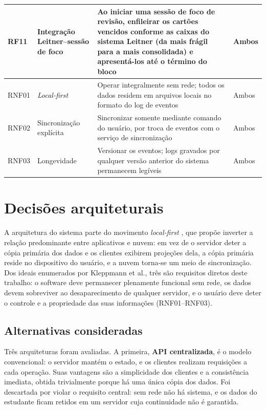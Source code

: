 \documentclass[12pt, %
openright, 
oneside,
a4paper,
english,   %
brazil]{facom-ufu-abntex2}
\begin{document}
\begin{table}[htbp]
\begin{tabular}{p{1.2cm}p{3.4cm}p{6.6cm}p{2.2cm}}
RF11 & Integração Leitner--sessão de foco & Ao iniciar uma sessão de foco de revisão, enfileirar os cartões vencidos conforme as caixas do sistema Leitner (da mais frágil para a mais consolidada) e apresentá-los até o término do bloco & Ambos \\
\hline
RNF01 & \textit{Local-first} & Operar integralmente sem rede; todos os dados residem em arquivos locais no formato do log de eventos & Ambos \\
RNF02 & Sincronização explícita & Sincronizar somente mediante comando do usuário, por troca de eventos com o serviço de sincronização & Ambos \\
RNF03 & Longevidade & Versionar os eventos; logs gravados por qualquer versão anterior do sistema permanecem legíveis & Ambos \\
\hline
\end{tabular}
\end{table}

\section{Decisões arquiteturais}
\label{sec:decisoes-arquiteturais}

A arquitetura do sistema parte do movimento \textit{local-first}
\cite{Kleppmann2019LocalFirst}, que propõe inverter a relação predominante
entre aplicativos e nuvem: em vez de o servidor deter a cópia primária dos
dados e os clientes exibirem projeções dela, a cópia primária reside no
dispositivo do usuário, e a nuvem torna-se um meio de sincronização. Dos ideais
enumerados por Kleppmann et al., três são requisitos diretos deste trabalho: o
software deve permanecer plenamente funcional sem rede, os dados devem
sobreviver ao desaparecimento de qualquer servidor, e o usuário deve deter o
controle e a propriedade das suas informações (RNF01--RNF03).

\subsection{Alternativas consideradas}

Três arquiteturas foram avaliadas. A primeira, \textbf{API centralizada}, é o
modelo convencional: o servidor mantém o estado, e os clientes realizam
requisições a cada operação. Suas vantagens são a simplicidade dos clientes e a
consistência imediata, obtida trivialmente porque há uma única cópia dos dados.
Foi descartada por violar o requisito central: sem rede não há sistema, e os
dados do estudante ficam retidos em um servidor cuja continuidade não é
garantida.
\end{document}
